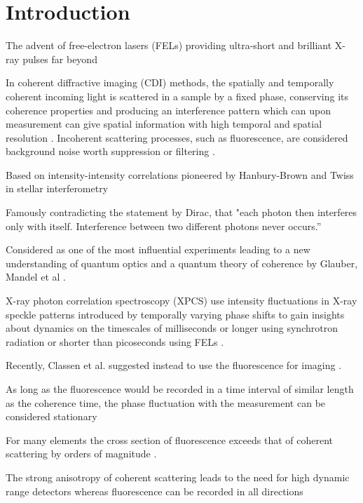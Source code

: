 \chapter{Introduction}



The advent of free-electron lasers (FELs) providing ultra-short and brilliant X-ray pulses far beyond 

In coherent diffractive imaging (CDI) methods, the spatially and temporally coherent incoming light is scattered in a sample by a fixed phase, conserving its coherence properties and producing an interference pattern 
which can upon measurement can give spatial information with high temporal and spatial resolution \cite{seibert2011,bostedt2010,barke2015}. Incoherent scattering processes, such as fluorescence, are considered background noise worth suppression or filtering \cite{schultz2013chapter7}. 

Based on intensity-intensity correlations pioneered by Hanbury-Brown and Twiss in stellar interferometry \cite{hanbury1956}

Famously contradicting the statement by Dirac, that "each photon then interferes only with itself. Interference between two different photons never occurs.” \cite{dirac1958}


Considered as one of the most influential experiments leading to a new understanding of quantum optics and a quantum theory of coherence by Glauber, Mandel et al \cite{glauber1963,mandel1959, glauber2006}.


 X-ray photon correlation spectroscopy (XPCS) use intensity fluctuations in X-ray speckle patterns introduced by  temporally varying phase shifts to gain insights about dynamics on the timescales of milliseconds or longer using synchrotron radiation or shorter than picoseconds using FELs \cite{lehmkuhler2021,grubel2007}.
 
 
 Recently, Classen et al. suggested instead to use the fluorescence for imaging \cite{classen2017}.

As long as the fluorescence would be recorded in a time interval of similar length as the coherence time, the phase fluctuation with the measurement can be considered stationary



For many elements the cross section of fluorescence exceeds that of coherent scattering by orders of magnitude \cite{xraylib}.



The strong anisotropy of coherent scattering leads to the need for high dynamic range detectors  whereas fluorescence can be recorded in all directions


